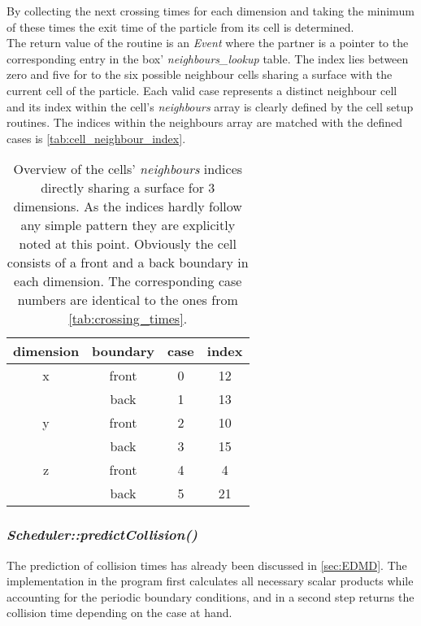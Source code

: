 By collecting the next crossing times for each dimension and taking the minimum of these times the exit time of the particle from its cell is determined.\\

The return value of the routine is an \textit{Event} where the partner is a pointer to the corresponding entry in the box' \textit{neighbours\_lookup} table. The index lies between zero and five for to the six possible neighbour cells sharing a surface with the current cell of the particle. Each valid case represents a distinct neighbour cell and its index within the cell's \textit{neighbours} array is clearly defined by the cell setup routines. The indices within the neighbours array are matched with the defined cases is \autoref{tab:cell_neighbour_index}. 

\begin{table}[h]
\centering
\begin{tabular}{c|c|c|c}
dimension & boundary & case & index \\ \hline
x & front & 0 & 12 \\
 & back & 1 & 13 \\ \hline
y & front & 2 & 10 \\
 & back & 3 & 15 \\ \hline
z & front & 4 & 4 \\
 & back & 5 & 21 \\
\end{tabular}
\caption[Lookup table of cell neighbour indices]{Overview of the cells' \textit{neighbours} indices directly sharing a surface for 3 dimensions. As the indices hardly follow any simple pattern they are explicitly noted at this point. Obviously the cell consists of a front and a back boundary in each dimension. The corresponding case numbers are identical to the ones from \autoref{tab:crossing_times}.}
\label{tab:cell_neighbour_index}
\end{table}
\FloatBarrier

\subsubsection{\quad \textit{Scheduler::predictCollision()}}
The prediction of collision times has already been discussed in \autoref{sec:EDMD}. The implementation in the program first calculates all necessary scalar products while accounting for the periodic boundary conditions, and in a second step returns the collision time depending on the case at hand.\\

